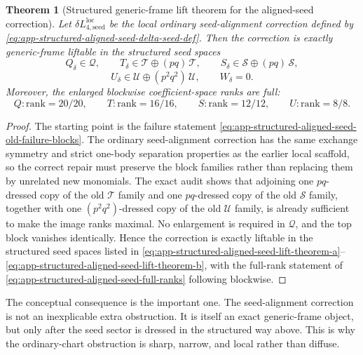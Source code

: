 \documentclass[11pt]{article}
\newtheorem{theorem}{Theorem}
\begin{document}
\begin{theorem}[Structured generic-frame lift theorem for the aligned-seed correction]
\label{thm:app-structured-aligned-seed-lift}
Let $\delta L_{4,\mathrm{seed}}^{\mathrm{loc}}$ be the local ordinary
seed-alignment correction defined by
\eqref{eq:app-structured-aligned-seed-delta-seed-def}.  Then the correction is
exactly generic-frame liftable in the structured seed spaces
\begin{equation}
Q_\delta\in \mathcal Q,
\qquad
T_\delta\in \mathcal T\oplus(pq)\,\mathcal T,
\qquad
S_\delta\in \mathcal S\oplus(pq)\,\mathcal S,
\label{eq:app-structured-aligned-seed-lift-theorem-a}
\end{equation}
\begin{equation}
U_\delta\in \mathcal U\oplus(p^2q^2)\,\mathcal U,
\qquad
W_\delta=0.
\label{eq:app-structured-aligned-seed-lift-theorem-b}
\end{equation}
Moreover, the enlarged blockwise coefficient-space ranks are full:
\begin{equation}
Q:\mathrm{rank}=20/20,
\qquad
T:\mathrm{rank}=16/16,
\qquad
S:\mathrm{rank}=12/12,
\qquad
U:\mathrm{rank}=8/8.
\label{eq:app-structured-aligned-seed-full-ranks}
\end{equation}
\end{theorem}

\begin{proof}
The starting point is the failure statement
\eqref{eq:app-structured-aligned-seed-old-failure-blocks}.  The ordinary
seed-alignment correction has the same exchange symmetry and strict one-body
separation properties as the earlier local scaffold, so the correct repair must
preserve the block families rather than replacing them by unrelated new
monomials.  The exact audit shows that adjoining one $pq$-dressed copy of the
old $\mathcal T$ family and one $pq$-dressed copy of the old $\mathcal S$
family, together with one $(p^2q^2)$-dressed copy of the old $\mathcal U$
family, is already sufficient to make the image ranks maximal.  No enlargement
is required in $\mathcal Q$, and the top block vanishes identically.  Hence the
correction is exactly liftable in the structured seed spaces listed in
\eqref{eq:app-structured-aligned-seed-lift-theorem-a}--
\eqref{eq:app-structured-aligned-seed-lift-theorem-b}, with the full-rank
statement of \eqref{eq:app-structured-aligned-seed-full-ranks} following
blockwise.
\end{proof}

The conceptual consequence is the important one.  The seed-alignment correction
is not an inexplicable extra obstruction.  It is itself an exact generic-frame
object, but only after the seed sector is dressed in the structured way above.
This is why the ordinary-chart obstruction is sharp, narrow, and local rather
than diffuse.
\end{document}
